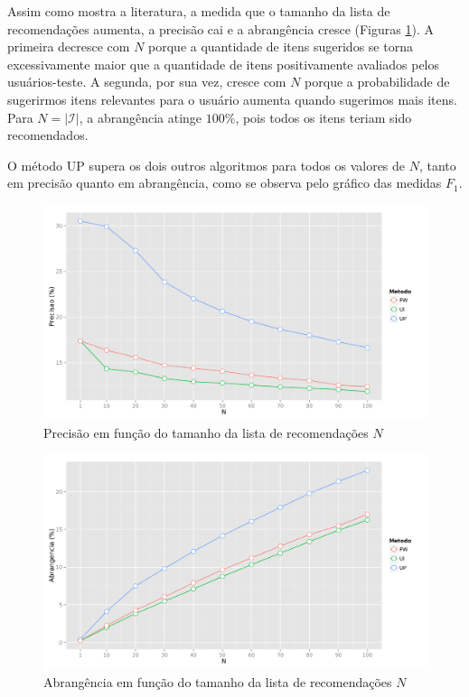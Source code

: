 Assim como mostra a literatura, a medida que o tamanho da lista de recomendações aumenta, a precisão cai e a abrangência cresce (Figuras \ref{fig:precision_N}). A primeira decresce com $N$ porque a quantidade de itens sugeridos se torna excessivamente maior que a quantidade de itens positivamente avaliados pelos usuários-teste. A segunda, por sua vez, cresce com $N$ porque a probabilidade de sugerirmos itens relevantes para o usuário aumenta quando sugerimos mais itens. Para $N=\left|\mathcal{I}\right|$, a abrangência atinge $100\%$, pois todos os itens teriam sido recomendados.

O método UP supera os dois outros algoritmos para todos os valores de $N$, tanto em precisão quanto em abrangência, como se observa pelo gráfico das medidas $F_1$.

\begin{figure}[htp]
    \begin{center}
    \includegraphics[width=1\textwidth]{img/precision_N}
    \end{center}
    \label{fig:precision_N}
    \caption{Precisão em função do tamanho da lista de recomendações $N$}
\end{figure}


\begin{figure}[htp]
    \begin{center}
    \includegraphics[width=1\textwidth]{img/recall_N}
    \end{center}
    \label{fig:recall_N}
    \caption{Abrangência em função do tamanho da lista de recomendações $N$}
\end{figure}

